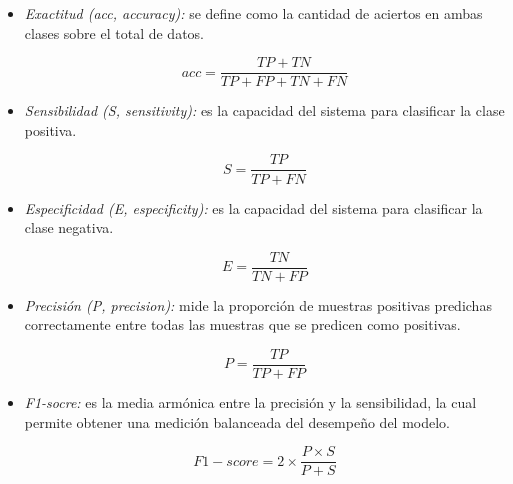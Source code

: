 \documentclass[10pt, a4paper]{article}
\begin{document}
\begin{itemize}
    \item \textit{Exactitud (acc, accuracy):} se define como la cantidad de aciertos en ambas clases sobre el total de datos.

    \begin{equation}
        acc = \frac{TP + TN}{TP + FP + TN + FN}
    \end{equation}

    \item \textit{Sensibilidad (S, sensitivity):} es la capacidad del sistema para clasificar la clase positiva.
    
    \begin{equation}
        S = \frac{TP}{TP+FN}
    \end{equation}

    \item \textit{Especificidad (E, especificity):} es la capacidad del sistema para clasificar la clase negativa.
    
    \begin{equation}
        E = \frac{TN}{TN+FP}
    \end{equation}

    \item \textit{Precisión (P, precision):} mide la proporción de muestras positivas predichas correctamente entre todas las muestras que se predicen como positivas.

    \begin{equation}
        P = \frac{TP}{TP+FP}
    \end{equation}

    \item \textit{F1-socre:} es la media armónica entre la precisión y la sensibilidad, la cual permite obtener una medición balanceada del desempeño del modelo.

    \begin{equation}
        F1-score = 2 \times \frac{P \times S}{P+S}
    \end{equation}
    
\end{itemize}




\end{document}
